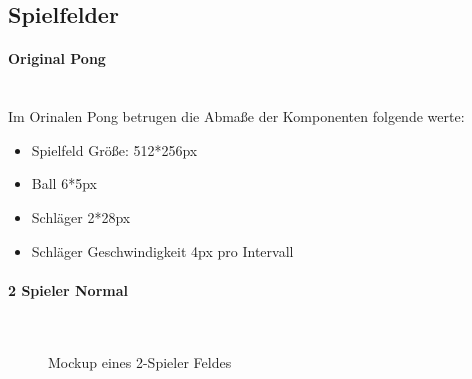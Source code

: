 \subsection{Spielfelder}
\paragraph{Original Pong}
\mbox{}\\
Im Orinalen Pong betrugen die Abmaße der Komponenten folgende werte:
\begin{itemize}
	\item
	      Spielfeld Größe: 512*256px
	\item
	      Ball 6*5px
	\item
	      Schläger 2*28px
	\item
	      Schläger Geschwindigkeit 4px pro Intervall
\end{itemize}
\newpage
\paragraph{2 Spieler Normal}
\mbox{}\\
\begin{figure}[ht]
	\begin{center}
	\end{center}
	\caption{Mockup eines 2-Spieler Feldes}
	\label{figx}
\end{figure}
\newline
